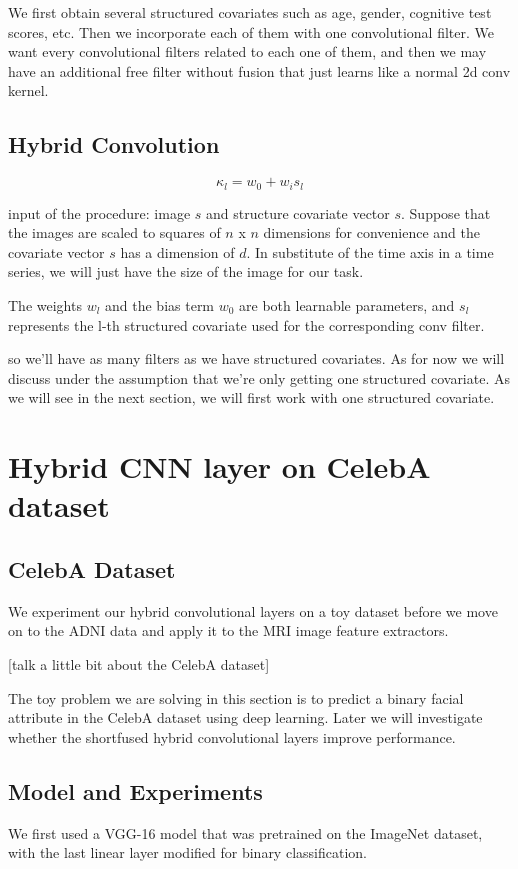 \documentclass{article}
\begin{document}
We first obtain several structured covariates such as age, gender, cognitive test scores, etc. Then we incorporate each of them with one convolutional filter. We want every convolutional filters related to each one of them, and then we may have an additional free filter without fusion that just learns like a normal 2d conv kernel. 

\subsection{Hybrid Convolution}

$$\kappa_l = w_0 + w_i s_l$$ 

input of the procedure: image $s$ and structure covariate vector $s$.
Suppose that the images are scaled to squares of $n$ x $n$ dimensions for convenience and the covariate vector $s$ has a dimension of $d$. In substitute of the time axis in a time series, we will just have the size of the image for our task. 

The weights $w_l$ and the bias term $w_0$ are both learnable parameters, and $s_l$ represents the l-th structured covariate used for the corresponding conv filter.  

so we'll have as many filters as we have structured covariates.
As for now we will discuss under the assumption that we're only getting one structured covariate. As we will see in the next section, we will first work with one structured covariate. 

\section{Hybrid CNN layer on CelebA dataset}

\subsection{CelebA Dataset}

We experiment our hybrid convolutional layers on a toy dataset before we move on to the ADNI data and apply it to the MRI image feature extractors.

[talk a little bit about the CelebA dataset]

The toy problem we are solving in this section is to predict a binary facial attribute in the CelebA dataset using deep learning. Later we will investigate whether the shortfused hybrid convolutional layers improve performance.

\subsection{Model and Experiments}
We first used a VGG-16 model that was pretrained on the ImageNet dataset, with the last linear layer modified for binary classification.
\end{document}
